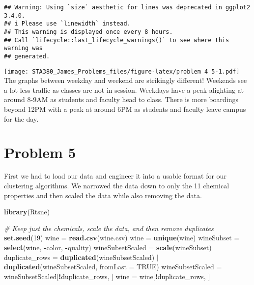 \documentclass[
]{article}
\newenvironment{Shaded}{\begin{snugshade}}{\end{snugshade}}
\newcommand{\AttributeTok}[1]{\textcolor[rgb]{0.13,0.29,0.53}{#1}}
\newcommand{\CommentTok}[1]{\textcolor[rgb]{0.56,0.35,0.01}{\textit{#1}}}
\newcommand{\ConstantTok}[1]{\textcolor[rgb]{0.56,0.35,0.01}{#1}}
\newcommand{\DecValTok}[1]{\textcolor[rgb]{0.00,0.00,0.81}{#1}}
\newcommand{\FunctionTok}[1]{\textcolor[rgb]{0.13,0.29,0.53}{\textbf{#1}}}
\newcommand{\NormalTok}[1]{#1}
\newcommand{\OtherTok}[1]{\textcolor[rgb]{0.56,0.35,0.01}{#1}}
\newcommand{\SpecialCharTok}[1]{\textcolor[rgb]{0.81,0.36,0.00}{\textbf{#1}}}
\newcommand{\StringTok}[1]{\textcolor[rgb]{0.31,0.60,0.02}{#1}}
\begin{document}
\begin{verbatim}
## Warning: Using `size` aesthetic for lines was deprecated in ggplot2 3.4.0.
## i Please use `linewidth` instead.
## This warning is displayed once every 8 hours.
## Call `lifecycle::last_lifecycle_warnings()` to see where this warning was
## generated.
\end{verbatim}

\texttt{[image: STA380\_James\_Problems\_files/figure-latex/problem 4 5-1.pdf]}
The graphs between weekday and weekend are strikingly different!
Weekends see a lot less traffic as classes are not in session. Weekdays
have a peak alighting at around 8-9AM as students and faculty head to
class. There is more boardings beyond 12PM with a peak at around 6PM as
students and faculty leave campus for the day.

\section{Problem 5}\label{problem-5}

First we had to load our data and engineer it into a usable format for
our clustering algorithms. We narrowed the data down to only the 11
chemical properties and then scaled the data while also removing the
data.

\begin{Shaded}
\begin{Highlighting}[]
\FunctionTok{library}\NormalTok{(Rtsne)}

\CommentTok{\# Keep just the chemicals, scale the data, and then remove duplicates}
\FunctionTok{set.seed}\NormalTok{(}\DecValTok{19}\NormalTok{)}
\NormalTok{wine }\OtherTok{=} \FunctionTok{read.csv}\NormalTok{(}\StringTok{\textquotesingle{}wine.csv\textquotesingle{}}\NormalTok{)}
\NormalTok{wine }\OtherTok{=} \FunctionTok{unique}\NormalTok{(wine)}
\NormalTok{wineSubset }\OtherTok{=} \FunctionTok{select}\NormalTok{(wine, }\SpecialCharTok{{-}}\NormalTok{color, }\SpecialCharTok{{-}}\NormalTok{quality)}
\NormalTok{wineSubsetScaled }\OtherTok{=} \FunctionTok{scale}\NormalTok{(wineSubset)}
\NormalTok{duplicate\_rows }\OtherTok{=} \FunctionTok{duplicated}\NormalTok{(wineSubsetScaled) }\SpecialCharTok{|} \FunctionTok{duplicated}\NormalTok{(wineSubsetScaled, }\AttributeTok{fromLast =} \ConstantTok{TRUE}\NormalTok{)}
\NormalTok{wineSubsetScaled }\OtherTok{=}\NormalTok{ wineSubsetScaled[}\SpecialCharTok{!}\NormalTok{duplicate\_rows, ]}
\NormalTok{wine }\OtherTok{=}\NormalTok{ wine[}\SpecialCharTok{!}\NormalTok{duplicate\_rows, ]}
\end{Highlighting}
\end{Shaded}
\end{document}
